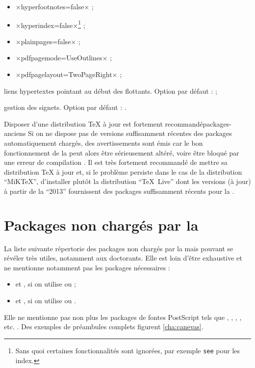 \begin{description}
\begin{itemize}
  \item ×hyperfootnotes=false× ;
  \item ×hyperindex=false×\footnote{Sans quoi certaines fonctionnalités sont
      ignorées, par exemple \protect\lstinline|see| pour les index.} ;
  \item ×plainpages=false× ;
  \item ×pdfpagemode=UseOutlines× ;
  \item ×pdfpagelayout=TwoPageRight× ;
  \end{itemize}
\item[\package{hypcap} :] liens hypertextes pointant au début des
  flottants\ifscreenoutput. Option par défaut :  ;
\item[\package{bookmark} :] gestion des signets\ifscreenoutput. Option par
  défaut : .
\end{description}

\begin{dbremark}{Disposer d'une distribution \TeX{} à jour est fortement
    recommandé}{packages-anciens}
  Si on ne dispose pas de versions suffisamment récentes des packages
  automatiquement chargés, des avertissements sont émis car le bon
  fonctionnement de la \yatcl{} peut alors être sérieusement altéré, voire être
  bloqué par une erreur de compilation . Il
  est très fortement recommandé de mettre sa distribution \TeX{} à jour et, si
  le problème persiste dans le cas de la distribution \enquote{MiK\TeX{}},
  d'installer plutôt la distribution \enquote{\TeX~Live} dont les versions (à
  jour) à partir de la \enquote{2013} fournissent des packages suffisamment
  récents pour la \yatcl.
\end{dbremark}

\section{Packages non chargés par la \yatcl{}}

La liste suivante répertorie des packages non chargés par la \yatcl{} mais
pouvant se révéler très utiles, notamment aux doctorants.  Elle est loin d'être
exhaustive et ne mentionne notamment pas les packages nécessaires :
\begin{itemize}
\item {} et , si on utilise  ou
   ;
\item {} et , si on utilise 
  ou .
\end{itemize}
Elle ne mentionne pas non plus les packages de fontes PostScript tels que
, , , ,
etc. . Des exemples de préambules complets figurent
\vref{cha:canevas}.

